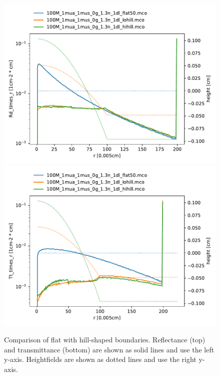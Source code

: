 \documentclass[]{article}
\begin{document}
\begin{figure}[ht!]
	\includegraphics[width=\linewidth]{img/hill_R.pdf}
	\includegraphics[width=\linewidth]{img/hill_T.pdf}
	\caption{Comparison of flat with hill-shaped boundaries. Reflectance (top) and transmittance (bottom) are shown as solid lines and use the left y-axis. Heightfields are shown as dotted lines and use the right y-axis.}
	\label{results:fig:hill}
\end{figure}
\end{document}
